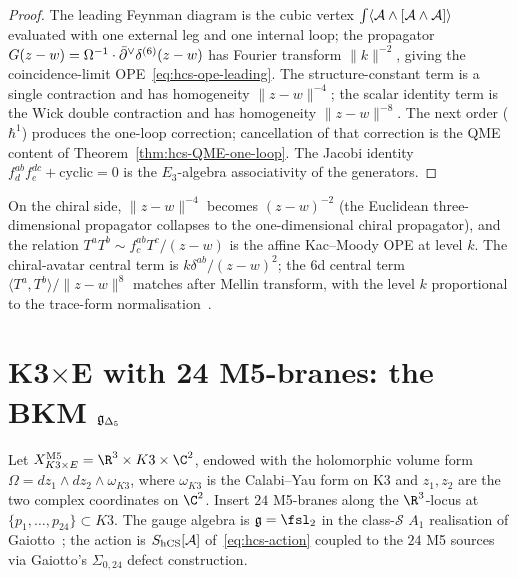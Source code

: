\begin{proof}
The leading Feynman diagram is the cubic vertex
$\int\langle\mathcal{A}\wedge[\mathcal{A}\wedge\mathcal{A}]\rangle$ evaluated with one external
leg and one internal loop; the propagator
$G(z-w) = \Omega^{-1}\cdot\bar\partial^\vee\delta^{(6)}(z-w)$ has Fourier
transform $\|k\|^{-2}$, giving the coincidence-limit
OPE~\eqref{eq:hcs-ope-leading}. The structure-constant term is a
single contraction and has homogeneity \(\|z-w\|^{-4}\); the scalar
identity term is the Wick double contraction and has homogeneity
\(\|z-w\|^{-8}\). The next order ($\hbar^1$) produces
the one-loop correction; cancellation of that correction is the QME
content of Theorem~\ref{thm:hcs-QME-one-loop}. The Jacobi
identity $f^{ab}_df^{dc}_e + \text{cyclic} = 0$ is the $E_3$-algebra
associativity of the generators.
\end{proof}

\begin{remark}
\label{rem:chiral-avatar-ope}
On the chiral side, $\|z-w\|^{-4}$ becomes $(z-w)^{-2}$ (the
Euclidean three-dimensional propagator collapses to the
one-dimensional chiral propagator), and the relation
$T^aT^b\sim f^{ab}_cT^c/(z-w)$ is the affine Kac--Moody OPE at level
$k$. The chiral-avatar central term is $k\delta^{ab}/(z-w)^2$;
the 6d central term $\langle T^a,T^b\rangle/\|z-w\|^8$ matches after
Mellin transform, with the level $k$ proportional to the trace-form
normalisation~\cite{CostelloYangian}.
\end{remark}

\section{K3$\times$E with 24 M5-branes: the BKM $\mathfrak{g}_{\Delta_5}$}
\label{sec:hcs-k3xE-bkm}

\begin{definition}
\label{def:hcs-k3xE}
%
Let
$X_{K3\times E}^{\mathrm{M5}} = \R^3\times K3\times\C^2$, endowed with
the holomorphic volume form
$\Omega = dz_1\wedge dz_2\wedge\omega_{K3}$, where $\omega_{K3}$ is the
Calabi--Yau form on K3 and $z_1,z_2$ are the two complex coordinates
on $\C^2$. Insert $24$ M5-branes along the $\R^3$-locus at
$\{p_1,\ldots,p_{24}\}\subset K3$. The gauge algebra is
$\fg = \fsl_2$ in the class-$\mathcal S$ $A_1$ realisation of
Gaiotto~\cite{Gaiotto2009}; the action is
$S_{\mathrm{hCS}}[\mathcal{A}]$ of~\eqref{eq:hcs-action} coupled to the $24$ M5
sources via Gaiotto's $\Sigma_{0,24}$ defect construction.
\end{definition}

